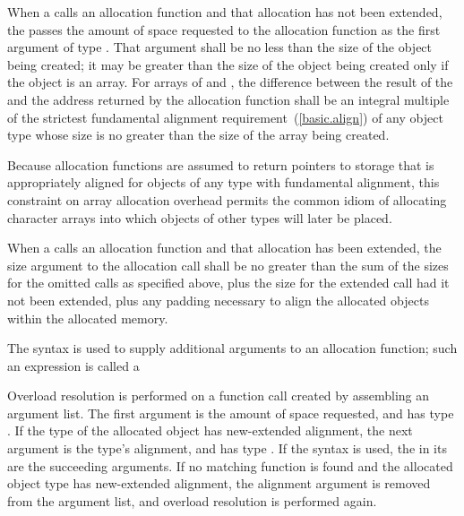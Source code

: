 \pnum
When a  calls an allocation function and that
allocation has not been extended, the
 passes the amount of space requested to the
allocation function as the first argument of type
. That argument shall be no less than the size
of the object being created; it may be greater than the size of the
object being created only if the object is an array. For arrays of
 and , the difference between the
result of the  and the address returned by the
allocation function shall be an integral multiple of the
strictest fundamental
alignment requirement~(\ref{basic.align}) of any object type whose size
is no greater than the size of the array being created.
\begin{note}
%
Because allocation functions are assumed to return pointers to storage
that is appropriately aligned for objects of any type
with fundamental alignment, this constraint
on array allocation overhead permits the common idiom of allocating
character arrays into which objects of other types will later be placed.
\end{note}

\pnum
When a  calls an allocation function and that
allocation has been extended, the size argument to the allocation call shall
be no greater than the sum of the sizes for the omitted calls as specified
above, plus the size for the extended call had it not been extended, plus any
padding necessary to align the allocated objects within the allocated memory.

\pnum
{}%
%
The  syntax is used to supply additional
arguments to an allocation function; such an expression is called
a 

\pnum
Overload resolution is
performed on a function call created by assembling an argument list.
The first argument is
the amount of space requested,
and has type .
If the type of the allocated object has new-extended alignment,
the next argument is
the type's alignment,
and has type .
If the  syntax is used,
the 
in its 
are the succeeding arguments.
If no matching function is found
and the allocated object type has new-extended alignment,
the alignment argument is removed from the argument list,
and overload resolution is performed again.

